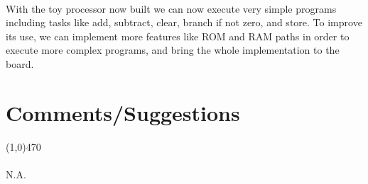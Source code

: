 \documentclass[12pt]{article}
\begin{document}
	\paragraph{} 
		With the toy processor now built we can now execute very simple programs including tasks like add, subtract, clear, branch if not zero, and store. To improve its use, we can implement more features like ROM and RAM paths in order to execute more complex programs, and bring the whole implementation to the board. 

 \section{Comments/Suggestions}\vspace{-.7cm} \line(1,0){470}
 	\paragraph{} 
 		N.A.
		
\end{document}
